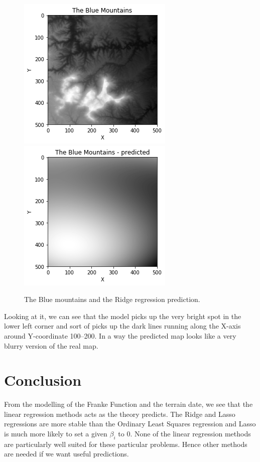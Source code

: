 \documentclass[parskip=half]{scrartcl}
\theoremstyle{definition}
\theoremstyle{remark}
\begin{document}
\begin{figure}[H]
\caption{The Blue mountains and the Ridge regression prediction.}
\label{fig:maps}
\centering
\includegraphics[scale=0.5]{bmreal.png}
\includegraphics[scale=0.5]{bmpred.png}
\end{figure}

Looking at it, we can see that the model picks up the very bright spot in the lower left corner and sort of picks up the dark lines running along the X-axis around Y-coordinate 100--200. 
In a way the predicted map looks like a very blurry version of the real map. 

\section{Conclusion} \label{sec:conclusion}

From the modelling of the Franke Function and the terrain date, we see that the linear regression methods acts as the theory predicts.
The Ridge and Lasso regressions are more stable than the Ordinary Least Squares regression and Lasso is much more likely to set a given $\beta_i$ to $0$. 
None of the linear regression methods are particularly well suited for these particular problems. 
Hence other methods are needed if we want useful predictions. 


\end{document}
